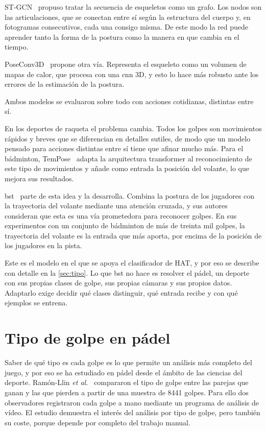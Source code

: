 ST-GCN~\cite{yan2018stgcn} propuso tratar la secuencia de esqueletos como un grafo.
Los nodos son las articulaciones, que se conectan entre sí según la estructura del cuerpo y, en fotogramas consecutivos, cada una consigo misma.
De este modo la red puede aprender tanto la forma de la postura como la manera en que cambia en el tiempo.

PoseConv3D~\cite{duan2022poseconv3d} propone otra vía.
Representa el esqueleto como un volumen de mapas de calor, que procesa con una \acs{cnn} 3D, y esto lo hace más robusto ante los errores de la estimación de la postura.

Ambos modelos se evaluaron sobre todo con acciones cotidianas, distintas entre sí.

En los deportes de raqueta el problema cambia.
Todos los golpes son movimientos rápidos y breves que se diferencian en detalles sutiles, de modo que un modelo pensado para acciones distintas entre sí tiene que afinar mucho más.
Para el bádminton, TemPose~\cite{ibh2023tempose} adapta la arquitectura transformer al reconocimiento de este tipo de movimientos y añade como entrada la posición del volante, lo que mejora sus resultados.

\ac{bst}~\cite{chang2026bst} parte de esta idea y la desarrolla.
Combina la postura de los jugadores con la trayectoria del volante mediante una atención cruzada, y sus autores consideran que esta es una vía prometedora para reconocer golpes.
En sus experimentos con un conjunto de bádminton de más de treinta mil golpes, la trayectoria del volante es la entrada que más aporta, por encima de la posición de los jugadores en la pista.

Este es el modelo en el que se apoya el clasificador de HAT, y por eso se describe con detalle en la \cref{sec:tipo}.
Lo que \acs{bst} no hace es resolver el pádel, un deporte con sus propias clases de golpe, sus propias cámaras y sus propios datos.
Adaptarlo exige decidir qué clases distinguir, qué entrada recibe y con qué ejemplos se entrena.

\section{Tipo de golpe en pádel}
\label{sec:arte-tipo}

Saber de qué tipo es cada golpe es lo que permite un análisis más completo del juego, y por eso se ha estudiado en pádel desde el ámbito de las ciencias del deporte.
Ramón-Llin \textit{et al.}~\cite{ramonllin2020stroke} compararon el tipo de golpe entre las parejas que ganan y las que pierden a partir de una muestra de 8441 golpes.
Para ello dos observadores registraron cada golpe a mano mediante un programa de análisis de vídeo.
El estudio demuestra el interés del análisis por tipo de golpe, pero también su coste, porque depende por completo del trabajo manual.

